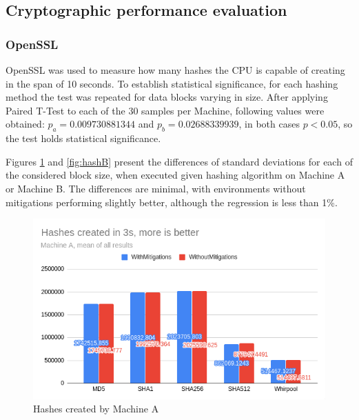 \documentclass{csfourzero}
\begin{document}
\subsection{Cryptographic performance evaluation}

\subsubsection{OpenSSL}

OpenSSL was used to measure how many hashes the CPU is capable of creating in the span of 10 seconds. To establish statistical significance, for each hashing method the test was repeated for data blocks varying in size. After applying Paired T-Test to each of the 30 samples per Machine, following values were obtained: $p_{a} = 0.009730881344$ and $p_{b} = 0.02688339939$, in both cases $p < 0.05$, so the test holds statistical significance.

Figures \ref{fig:hashA} and \ref{fig:hashB} present the differences of standard deviations for each of the considered block size, when executed given hashing algorithm on Machine A or Machine B. The differences are minimal, with environments without mitigations performing slightly better, although the regression is less than 1\%. 

\begin{figure}[!h]
\centering
\includegraphics[width=15cm]{hashA}
\caption{Hashes created by Machine A}
\label{fig:hashA}
\end{figure}
\end{document}
